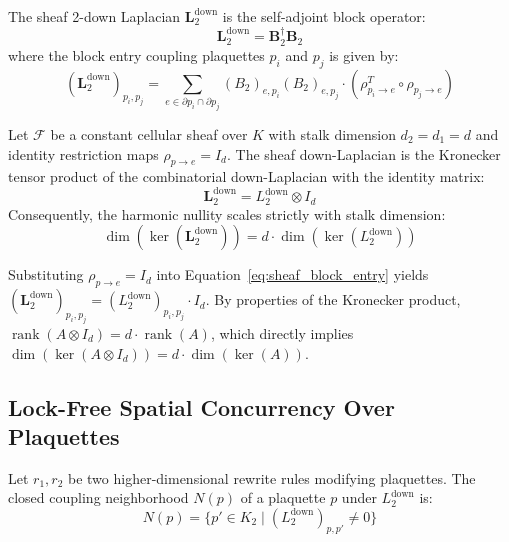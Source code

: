 \documentclass[conference]{IEEEtran}
\begin{document}
The sheaf 2-down Laplacian $\mathbf{L}_2^{\text{down}}$ is the self-adjoint block operator:
\begin{equation}
\mathbf{L}_2^{\text{down}} = \mathbf{B}_2^\dagger \mathbf{B}_2
\label{eq:sheaf_down_laplacian}
\end{equation}
where the block entry coupling plaquettes $p_i$ and $p_j$ is given by:
\begin{equation}
(\mathbf{L}_2^{\text{down}})_{p_i, p_j} = \sum_{e \in \partial p_i \cap \partial p_j} (B_2)_{e, p_i} (B_2)_{e, p_j} \cdot \left( \rho_{p_i \to e}^T \circ \rho_{p_j \to e} \right)
\label{eq:sheaf_block_entry}
\end{equation}

\begin{theorem}
Let $\mathcal{F}$ be a constant cellular sheaf over $K$ with stalk dimension $d_2 = d_1 = d$ and identity restriction maps $\rho_{p \to e} = I_d$. The sheaf down-Laplacian is the Kronecker tensor product of the combinatorial down-Laplacian with the identity matrix:
\begin{equation}
\mathbf{L}_2^{\text{down}} = L_2^{\text{down}} \otimes I_d
\end{equation}
Consequently, the harmonic nullity scales strictly with stalk dimension:
\begin{equation}
\dim(\ker(\mathbf{L}_2^{\text{down}})) = d \cdot \dim(\ker(L_2^{\text{down}}))
\label{eq:tensoring_nullity}
\end{equation}
\end{theorem}
\begin{IEEEproof}
Substituting $\rho_{p \to e} = I_d$ into Equation~\eqref{eq:sheaf_block_entry} yields $(\mathbf{L}_2^{\text{down}})_{p_i, p_j} = (L_2^{\text{down}})_{p_i, p_j} \cdot I_d$. By properties of the Kronecker product, $\operatorname{rank}(A \otimes I_d) = d \cdot \operatorname{rank}(A)$, which directly implies $\dim(\ker(A \otimes I_d)) = d \cdot \dim(\ker(A))$.
\end{IEEEproof}

\subsection{Lock-Free Spatial Concurrency Over Plaquettes}
Let $r_1, r_2$ be two higher-dimensional rewrite rules modifying plaquettes. The closed coupling neighborhood $N(p)$ of a plaquette $p$ under $L_2^{\text{down}}$ is:
\begin{equation}
N(p) = \{ p' \in K_2 \mid (L_2^{\text{down}})_{p, p'} \neq 0 \}
\label{eq:neighborhood}
\end{equation}
\end{document}
